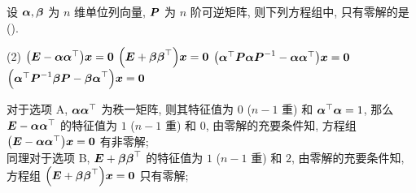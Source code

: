 \begin{example}
    设 $\vb*{\alpha},\vb*{\beta}$ 为 $n$ 维单位列向量, $\vb*{P}$ 为 $n$ 阶可逆矩阵, 则下列方程组中, 只有零解的是 (\quad).
    \begin{tasks}(2)
        \task $\qty(\vb*{E}-\vb*{\alpha\alpha}^\top)\vb*{x}=\vb*{0}$
        \task $\qty(\vb*{E}+\vb*{\beta\beta}^\top)\vb*{x}=\vb*{0}$
        \task $\qty(\vb*{\alpha}^\top\vb*{P}\vb*{\alpha P}^{-1}-\vb*{\alpha\alpha}^\top)\vb*{x}=\vb*{0}$
        \task $\qty(\vb*{\alpha}^\top\vb*{P}^{-1}\vb*{\beta P}-\vb*{\beta\alpha}^\top)\vb*{x}=\vb*{0}$
    \end{tasks}
\end{example}
\begin{solution}
    对于选项 A, $\vb*{\alpha\alpha}^\top$ 为秩一矩阵, 则其特征值为 $0$ ($n-1$ 重) 和 $\vb*{\alpha}^\top\vb*{\alpha}=1$, 那么 $\vb*{E}-\vb*{\alpha\alpha}^\top$ 的特征值为 $1$ ($n-1$ 重) 和 $0$, 由零解的充要条件知, 方程组 $\qty(\vb*{E}-\vb*{\alpha\alpha}^\top)\vb*{x}=\vb*{0}$ 有非零解;\\
    同理对于选项 B, $\vb*{E}+\vb*{\beta\beta}^\top$ 的特征值为 $1$ ($n-1$ 重) 和 $2$, 由零解的充要条件知, 方程组 $\qty(\vb*{E}+\vb*{\beta\beta}^\top)\vb*{x}=\vb*{0}$ 只有零解;\\ 

\end{solution}
